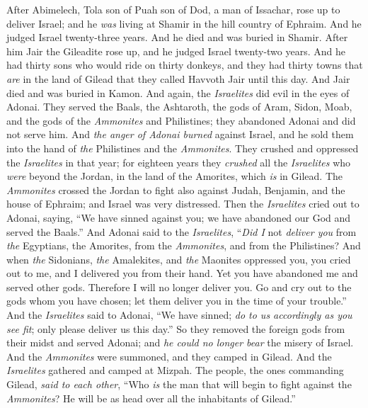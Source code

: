 \begin{biblechapter} %
 After Abimelech, Tola son of Puah son of Dod, a man of Issachar, rose up to deliver Israel; and he \textit{was} living at Shamir in the hill country of Ephraim.
\verse And he judged Israel twenty-three years. And he died and was buried in Shamir.
\verse After him Jair the Gileadite rose up, and he judged Israel twenty-two years.
\verse And he had thirty sons who would ride on thirty donkeys, and they had thirty towns that \textit{are} in the land of Gilead that they called Havvoth Jair until this day.
\verse And Jair died and was buried in Kamon.
\verse And again, the \textit{Israelites} did evil in the eyes of Adonai. They served the Baals, the Ashtaroth, the gods of Aram, Sidon, Moab, and the gods of the \textit{Ammonites} and Philistines; they abandoned Adonai and did not serve him.
\verse And \textit{the anger of Adonai burned} against Israel, and he sold them into the hand of \textit{the} Philistines and the \textit{Ammonites}.
\verse They crushed and oppressed the \textit{Israelites} in that year; for eighteen years they \textit{crushed} all the \textit{Israelites} who \textit{were} beyond the Jordan, in the land of the Amorites, which \textit{is} in Gilead.
\verse The \textit{Ammonites} crossed the Jordan to fight also against Judah, Benjamin, and the house of Ephraim; and Israel was very distressed.
\verse Then the \textit{Israelites} cried out to Adonai, saying, “We have sinned against you; we have abandoned our God and served the Baals.”
\verse And Adonai said to the \textit{Israelites}, “\textit{Did I} not \textit{deliver you} from \textit{the} Egyptians, the Amorites, from the \textit{Ammonites}, and from the Philistines?
\verse And when \textit{the} Sidonians, \textit{the} Amalekites, and \textit{the} Maonites oppressed you, you cried out to me, and I delivered you from their hand.
\verse Yet you have abandoned me and served other gods. Therefore I will no longer deliver you.
\verse Go and cry out to the gods whom you have chosen; let them deliver you in the time of your trouble.”
\verse And the \textit{Israelites} said to Adonai, “We have sinned; \textit{do to us accordingly as you see fit}; only please deliver us this day.”
\verse So they removed the foreign gods from their midst and served Adonai; and \textit{he could no longer bear} the misery of Israel.
\verse And the \textit{Ammonites} were summoned, and they camped in Gilead. And the \textit{Israelites} gathered and camped at Mizpah.
\verse The people, the ones commanding Gilead, \textit{said to each other}, “Who \textit{is} the man that will begin to fight against the \textit{Ammonites}? He will be as head over all the inhabitants of Gilead.”
\end{biblechapter}

